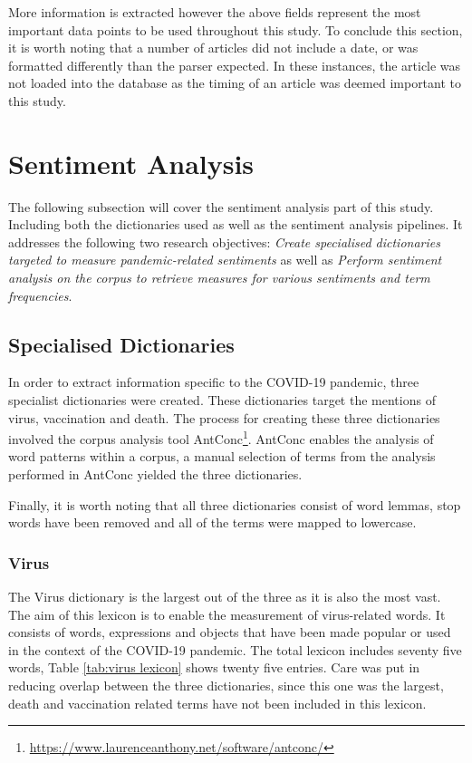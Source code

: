 More information is extracted however the above fields represent the most important data points to be used throughout this study. To conclude this section, it is worth noting that a number of articles did not include a date, or was formatted differently than the parser expected. In these instances, the article was not loaded into the database as the timing of an article was deemed important to this study.

\section{Sentiment Analysis}

The following subsection will cover the sentiment analysis part of this study. Including both the dictionaries used as well as the sentiment analysis pipelines. It addresses the following two research objectives: \emph{Create specialised dictionaries targeted to measure pandemic-related sentiments} as well as \emph{Perform sentiment analysis on the corpus to retrieve measures for various sentiments and term frequencies}.

\subsection{Specialised Dictionaries}\label{Custom Dicts}

In order to extract information specific to the COVID-19 pandemic, three specialist dictionaries were created. These dictionaries target the mentions of virus, vaccination and death. The process for creating these three dictionaries involved the corpus analysis tool AntConc\footnote{\url{https://www.laurenceanthony.net/software/antconc/}}. AntConc enables the analysis of word patterns within a corpus, a manual selection of terms from the analysis performed in AntConc yielded the three dictionaries.

Finally, it is worth noting that all three dictionaries consist of word lemmas, stop words have been removed and all of the terms were mapped to lowercase.

\subsubsection{Virus}

The Virus dictionary is the largest out of the three as it is also the most vast. The aim of this lexicon is to enable the measurement of virus-related words. It consists of words, expressions and objects that have been made popular or used in the context of the COVID-19 pandemic. The total lexicon includes seventy five words, Table \ref{tab:virus lexicon} shows twenty five entries. Care was put in reducing overlap between the three dictionaries, since this one was the largest, death and vaccination related terms have not been included in this lexicon.

